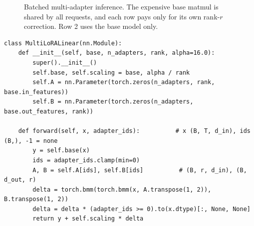 \begin{figure}[ht]
\centering
{}
\caption{Batched multi-adapter inference. The expensive base matmul is shared by all
requests, and each row pays only for its own rank-$r$ correction. Row 2 uses the base
model only.}
\label{fig:instruct:multilora}
\end{figure}

\begin{lstlisting}[caption={A gather-based multi-LoRA layer (reference, not a fused kernel).},label={lst:instruct:multilora}]
class MultiLoRALinear(nn.Module):
    def __init__(self, base, n_adapters, rank, alpha=16.0):
        super().__init__()
        self.base, self.scaling = base, alpha / rank
        self.A = nn.Parameter(torch.zeros(n_adapters, rank, base.in_features))
        self.B = nn.Parameter(torch.zeros(n_adapters, base.out_features, rank))

    def forward(self, x, adapter_ids):          # x (B, T, d_in), ids (B,), -1 = none
        y = self.base(x)
        ids = adapter_ids.clamp(min=0)
        A, B = self.A[ids], self.B[ids]          # (B, r, d_in), (B, d_out, r)
        delta = torch.bmm(torch.bmm(x, A.transpose(1, 2)), B.transpose(1, 2))
        delta = delta * (adapter_ids >= 0).to(x.dtype)[:, None, None]
        return y + self.scaling * delta
\end{lstlisting}

